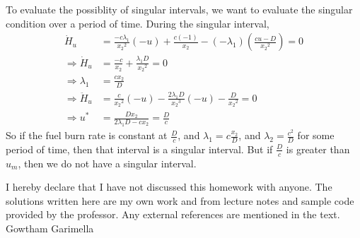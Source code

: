 \begin{enumerate}
 To evaluate the possiblity of singular intervals, we want to evaluate the singular condition over a period of time. During the singular interval, 
 \begin{align*}
  \dot H_u &= \frac{-c \lambda_1}{{x_2}^2} (-u) + \frac{c(-1)}{x_2} - (-\lambda_1)\left(\frac{cu - D}{{x_2}^2}\right) = 0\\ 
  \Rightarrow \dot H_u &= \frac{-c}{x_2} + \frac{\lambda_1 D}{{x_2}^2} = 0\\
  \Rightarrow \lambda_1 &= \frac{c x_2}{D}\\ 
  \Rightarrow \ddot H_u &= \frac{c}{{x_2}^2} (-u) - \frac{2\lambda_1 D}{{x_2}^3}(-u) - \frac{D}{{x_2}^2} = 0\\
  \Rightarrow   u^* &= \frac{D x_2}{2 \lambda_1 D - c x_2  } = \frac{D}{c}
 \end{align*}
 So if the fuel burn rate is constant at $\frac{D}{c}$, and $\lambda_1 = c \frac{x_2}{D}$, and $\lambda_2 = \frac{c^2}{D}$ for some period of time, then that interval is a singular interval. But if $\frac{D}{c}$ is greater than 
 $u_m$, then we do not have a singular interval.

\end{enumerate} 
\vfill
\begin{acknowledgements}
I hereby declare that I have not discussed this homework with anyone. The solutions written here are
my own work and  from lecture notes and sample code provided by the professor. Any 
external references are mentioned in the text.
\flushright Gowtham Garimella
\end{acknowledgements}





